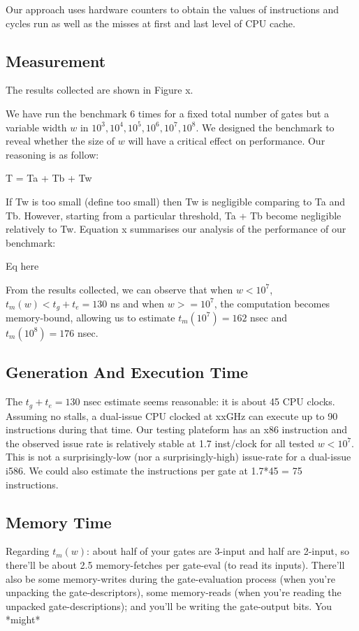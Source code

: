Our approach uses hardware counters to obtain the values of instructions and cycles run as well as the misses at first and last level of CPU cache.

\subsection{Measurement}
The results collected are shown in Figure x.

We have run the benchmark $6$ times for a fixed total number of gates  but a variable width $w$ in ${10^3, 10^4, 10^5, 10^6, 10^7, 10^8}$. We designed the benchmark to reveal whether the size of $w$ will have a critical effect on performance.
Our reasoning is as follow:
\par
T = Ta + Tb + Tw
\par
If Tw is too small (define too small) then Tw is negligible comparing to Ta and Tb. However, starting from a particular threshold, Ta + Tb become negligible relatively to Tw.
Equation x summarises our analysis of the performance of our benchmark:
\par
Eq here

From the results collected, we can observe that when $w < 10^7$, $t_m(w) < t_g + t_e = 130$ ns and when $w >= 10^7$, the computation becomes memory-bound, allowing us to estimate $t_m(10^7) = 162$ nsec and $t_m(10^8) = 176$ nsec.

\subsection{Generation  And Execution Time}
The $t_g + t_e = 130$ nsec estimate seems reasonable: it is about 45 CPU clocks. Assuming no stalls, a dual-issue CPU clocked at xxGHz can execute up to 90 instructions during that time. Our testing plateform has an x86 instruction and the observed issue rate is relatively stable at 1.7 inst/clock for all tested $w < 10^7$.  This is not a surprisingly-low (nor a surprisingly-high) issue-rate for a dual-issue i586.  We could also estimate the instructions per gate at  1.7*45 = 75 instructions.
\subsection{Memory Time}
Regarding $t_m(w)$: about half of your gates are 3-input and half are 2-input, so there'll be about 2.5 memory-fetches per gate-eval (to read its inputs).  There'll also be some memory-writes during the gate-evaluation process (when you're unpacking the gate-descriptors), some memory-reads (when you're reading the unpacked gate-descriptions); and you'll be writing the gate-output bits.   You *might*

